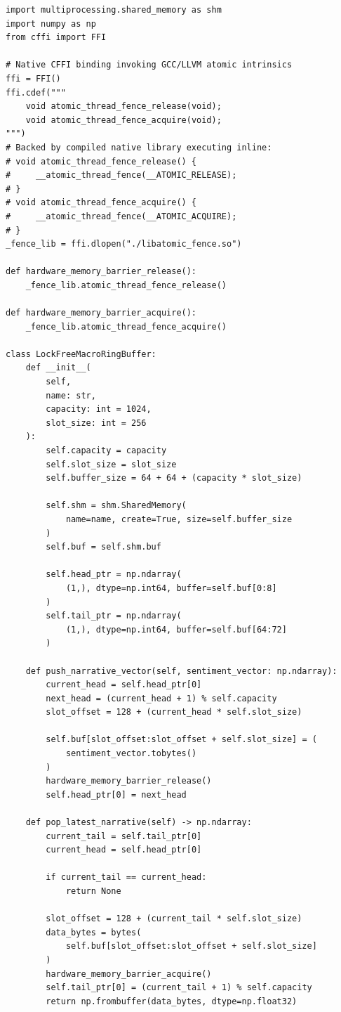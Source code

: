 \label{listing:lockfree_ring_buffer}
\begin{verbatim}
import multiprocessing.shared_memory as shm
import numpy as np
from cffi import FFI

# Native CFFI binding invoking GCC/LLVM atomic intrinsics
ffi = FFI()
ffi.cdef("""
    void atomic_thread_fence_release(void);
    void atomic_thread_fence_acquire(void);
""")
# Backed by compiled native library executing inline:
# void atomic_thread_fence_release() {
#     __atomic_thread_fence(__ATOMIC_RELEASE);
# }
# void atomic_thread_fence_acquire() {
#     __atomic_thread_fence(__ATOMIC_ACQUIRE);
# }
_fence_lib = ffi.dlopen("./libatomic_fence.so")

def hardware_memory_barrier_release():
    _fence_lib.atomic_thread_fence_release()

def hardware_memory_barrier_acquire():
    _fence_lib.atomic_thread_fence_acquire()

class LockFreeMacroRingBuffer:
    def __init__(
        self, 
        name: str, 
        capacity: int = 1024, 
        slot_size: int = 256
    ):
        self.capacity = capacity
        self.slot_size = slot_size
        self.buffer_size = 64 + 64 + (capacity * slot_size)
        
        self.shm = shm.SharedMemory(
            name=name, create=True, size=self.buffer_size
        )
        self.buf = self.shm.buf
        
        self.head_ptr = np.ndarray(
            (1,), dtype=np.int64, buffer=self.buf[0:8]
        )
        self.tail_ptr = np.ndarray(
            (1,), dtype=np.int64, buffer=self.buf[64:72]
        )

    def push_narrative_vector(self, sentiment_vector: np.ndarray):
        current_head = self.head_ptr[0]
        next_head = (current_head + 1) % self.capacity
        slot_offset = 128 + (current_head * self.slot_size)
        
        self.buf[slot_offset:slot_offset + self.slot_size] = (
            sentiment_vector.tobytes()
        )
        hardware_memory_barrier_release()
        self.head_ptr[0] = next_head

    def pop_latest_narrative(self) -> np.ndarray:
        current_tail = self.tail_ptr[0]
        current_head = self.head_ptr[0]
        
        if current_tail == current_head:
            return None
            
        slot_offset = 128 + (current_tail * self.slot_size)
        data_bytes = bytes(
            self.buf[slot_offset:slot_offset + self.slot_size]
        )
        hardware_memory_barrier_acquire()
        self.tail_ptr[0] = (current_tail + 1) % self.capacity
        return np.frombuffer(data_bytes, dtype=np.float32)
\end{verbatim}
\par\vspace*{\baselineskip}

